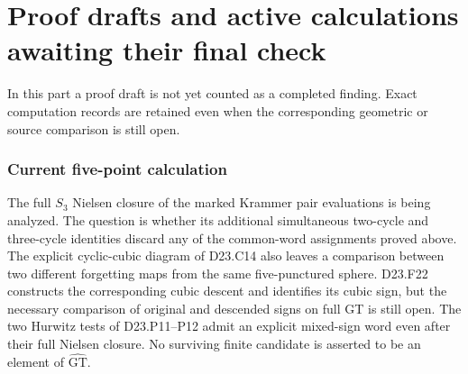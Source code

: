 \documentclass[11pt]{article}
\newcommand{\GT}{\widehat{\mathrm{GT}}}
\begin{document}
\part{Proof drafts and active calculations awaiting their final check}
In this part a proof draft is not yet counted as a completed
finding.  Exact computation records are retained even when the
corresponding geometric or source comparison is still open.
\section{Current five-point calculation}
The full $S_3$ Nielsen closure of the marked Krammer pair
evaluations is being analyzed. The question is whether its
additional simultaneous two-cycle and three-cycle identities
discard any of the common-word assignments proved above.
The explicit cyclic-cubic diagram of D23.C14 also leaves a
comparison between two different forgetting maps from the same
five-punctured sphere. D23.F22 constructs the corresponding cubic
descent and identifies its cubic sign, but the necessary comparison
of original and descended signs on full GT is still open.
The two Hurwitz tests of D23.P11--P12 admit an explicit mixed-sign
word even after their full Nielsen closure. No surviving finite
candidate is asserted to be an element of $\GT$.
\end{document}
